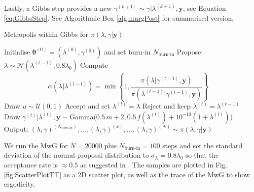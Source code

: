 

Lastly, a Gibbs step provides a new $\gamma^{(k+1)} \sim \gamma | \lambda^{(k+1)}, \bm{y}$, see Equation \eqref{eq:GibbsStep}.
See Algorithmic Box \ref{alg:margPost} for summarised version.
\begin{algorithm}[!ht]
	\caption{Metropolis within Gibbs for $\pi(\lambda, \gamma | \bm{y})$}
	\begin{algorithmic}[1]
		\STATE Initialise  \( \bm{\theta}^{(0)}  =( \lambda^{(0)} , \gamma^{(0)}  ) \) and set burn-in $N_{\text{burn-in}}$
		\STATE Propose \( \lambda \sim \mathcal{N}(\lambda^{(t-1)}, 0.8 \lambda_0)  \)
		\STATE Compute
		\[ \alpha( \lambda  | \lambda^{(t-1)}) = \min \left\{ 1, \frac{\pi(\lambda | \gamma^{(t-1)}, \bm{y})  }{\pi(\lambda^{(t-1)}| \gamma^{(t-1)}, \bm{y})}  \right\} \]
		\STATE Draw $u \sim \mathcal{U}(0,1)$
		\STATE Accept and set \( \lambda^{(t)} = \lambda \)
		\ELSE  
		\STATE Reject and keep \(\lambda^{(t)} = \lambda^{(t-1)} \)
		\ENDIF
		\STATE Draw $\gamma^{(t)} | \lambda^{(t)} ,\bm{y} \sim \text{Gamma} \big( 0.5  \, m + 2, 0.5 \, f(\lambda^{(t)}) + 10^{-10}(1 + \lambda^{(t)}) \big) $
		\ENDFOR
		\STATE Output: $ (\lambda, \gamma)^{(N_{\text{burn-in}})}, \dots,  (\lambda, \gamma)^{(k)} , \dots,   (\lambda, \gamma)^{(N)} \sim \pi(\lambda, \gamma| \bm{y}) $
	\end{algorithmic}
	\label{alg:margPost}
\end{algorithm}



We run the MwG for $N = 20000$ plus $N_{\text{burn-in}} = 100$ steps and set the standard deviation of the normal proposal distribution to $\sigma_{\lambda} = 0.8 \lambda_0$ so that the acceptance rate is $\approx 0.5$ as suggested in \cite{}.
The samples are plotted in Fig. \ref{fig:ScatterPlotTT} as a 2D scatter plot, as well as the trace of the MwG to show ergodicity.

